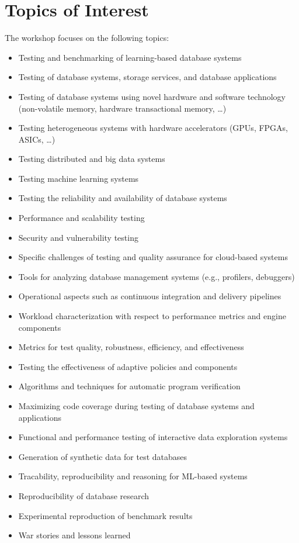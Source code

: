 \documentclass[sigconf]{acmart}
\begin{document}
\section{Topics of Interest}
The workshop focuses on the following topics:
\begin{itemize}
    \item Testing and benchmarking of learning-based database systems
    \item Testing of database systems, storage services, and database applications
    \item Testing of database systems using novel hardware and software technology (non-volatile memory, hardware transactional memory, …)
    \item Testing heterogeneous systems with hardware accelerators (GPUs, FPGAs, ASICs, …)
    \item Testing distributed and big data systems
    \item Testing machine learning systems
    \item Testing the reliability and availability of database systems
    \item Performance and scalability testing
    \item Security and vulnerability testing
    \item Specific challenges of testing and quality assurance for cloud-based systems
    \item Tools for analyzing database management systems (e.g., profilers, debuggers)
    \item Operational aspects such as continuous integration and delivery pipelines
    \item Workload characterization with respect to performance metrics and engine components
    \item Metrics for test quality, robustness, efficiency, and effectiveness
    \item Testing the effectiveness of adaptive policies and components
    \item Algorithms and techniques for automatic program verification
    \item Maximizing code coverage during testing of database systems and applications
    \item Functional and performance testing of interactive data exploration systems
    \item Generation of synthetic data for test databases
    \item Tracability, reproducibility and reasoning for ML-based systems
    \item Reproducibility of database research
    \item Experimental reproduction of benchmark results
    \item War stories and lessons learned
\end{itemize}
\end{document}
